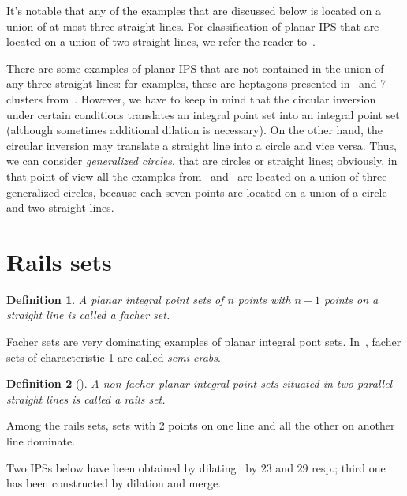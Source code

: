 \documentclass[12pt]{article}
\theoremstyle{theorem}
\theoremstyle{dfn}
\newtheorem{dfn}{Definition}
\theoremstyle{remark}
\begin{document}
It's notable that any of the examples that are discussed below
is located on a union of at most three straight lines.
For classification of planar IPS that are located on a union of two straight lines,
we refer the reader to~\cite{avdeev2019particular}.

There are some examples of planar IPS that are not contained in the union of any three straight lines:
for examples, these are heptagons presented in~\cite{kreisel2008heptagon} and 7-clusters from~\cite{kurz2013constructing}.
However, we have to keep in mind that the circular inversion under certain conditions
translates an integral point set into an integral point set
(although sometimes additional dilation is necessary).
On the other hand, the circular inversion may translate a straight line into a circle and vice versa.
Thus, we can consider \emph{generalized circles}, that are circles or straight lines;
obviously, in that point of view all the examples from~\cite{kreisel2008heptagon} and~\cite{kurz2013constructing}
are located on a union of three generalized circles,
because each seven points are located on a union of a circle and two straight lines.




\section{Rails sets}

\begin{dfn}
	A planar integral point sets of $n$ points with $n-1$ points on a straight line is called
	a \textit{facher} set.
\end{dfn}
Facher sets are very dominating examples of planar integral pont sets.
In~\cite{antonov2008maximal}, facher sets of characteristic 1 are called \textit{semi-crabs}.

\begin{dfn}[\cite{avdeev2019particular}]
	A non-facher planar integral point sets situated in two parallel straight lines
	is called a \textit{rails} set.
\end{dfn}

Among the rails sets, sets with 2 points on one line and all the other on another line dominate.


Two IPSs below have been obtained by dilating~\cite[Fig. 34]{avdeev2019particular} by $23$ and $29$  resp.;
third one has been constructed by dilation and merge.
\end{document}
